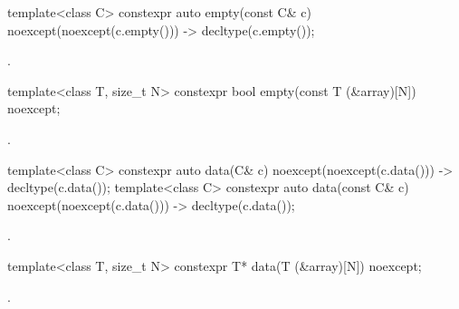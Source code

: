 %
\begin{itemdecl}
template<class C> constexpr auto empty(const C& c) noexcept(noexcept(c.empty()))
  -> decltype(c.empty());
\end{itemdecl}
\begin{itemdescr}
\pnum
\returns
{}.
\end{itemdescr}

%
\begin{itemdecl}
template<class T, size_t N> constexpr bool empty(const T (&array)[N]) noexcept;
\end{itemdecl}
\begin{itemdescr}
\pnum
\returns
{}.
\end{itemdescr}

%
\begin{itemdecl}
template<class C> constexpr auto data(C& c) noexcept(noexcept(c.data())) -> decltype(c.data());
template<class C> constexpr auto data(const C& c) noexcept(noexcept(c.data()))
  -> decltype(c.data());
\end{itemdecl}
\begin{itemdescr}
\pnum
\returns
{}.
\end{itemdescr}

%
\begin{itemdecl}
template<class T, size_t N> constexpr T* data(T (&array)[N]) noexcept;
\end{itemdecl}
\begin{itemdescr}
\pnum
\returns
{}.
\end{itemdescr}
